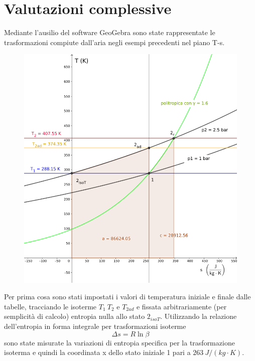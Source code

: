 \documentclass[a4paper,12pt]{article}
\begin{document}
\section{Valutazioni complessive}
\label{sec:valutazioni_complessive}
Mediante l'ausilio del software GeoGebra sono state rappresentate le trasformazioni compiute dall'aria negli esempi
precedenti nel piano T-s.
\begin{figure}[H]
    \label{fig:trasformazioni}
    \centering
    \includegraphics[width=0.65\linewidth]{media/isobare_T-S_resize.png}
\end{figure}
Per prima cosa sono stati impostati i valori di temperatura iniziale e finale dalle tabelle, tracciando le isoterme
$T_1\ T_2$ e $T_{2ad}$ e fissata arbitrariamente (per semplicità di calcolo) entropia nulla allo stato $2_{isoT}$.
Utilizzando la relazione dell'entropia in forma integrale per trasformazioni isoterme
\begin{equation*}
    \Delta s = R\ln\beta
\end{equation*}
sono state misurate la variazioni di entropia specifica per la trasformazione isoterma e quindi la coordinata x dello stato iniziale 1
pari a $263\ J/(kg\cdot K)$.
\end{document}
